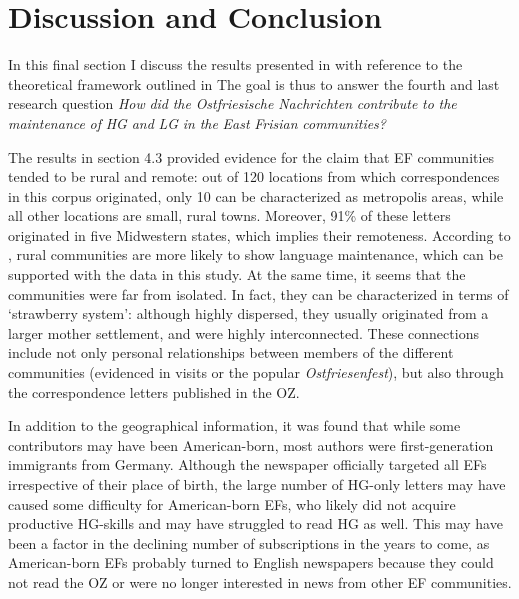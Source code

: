 \documentclass[output=paper]{langsci/langscibook}
\begin{document}
\section{Discussion and Conclusion} %
\label{sec:rocker:5}
 
In this final section I discuss the results presented in  with reference to the theoretical framework outlined in  The goal is thus to answer the fourth and last research question \textit{How} \textit{did} \textit{the} \textit{Ostfriesische} \textit{Nachrichten} \textit{contribute} \textit{to} \textit{the} \textit{maintenance} \textit{of} \textit{HG} \textit{and} \textit{LG} \textit{in} \textit{the} \textit{East} \textit{Frisian} \textit{communities?}
 

 
The results in section 4.3 provided evidence for the claim that EF communities tended to be rural and remote: out of 120 locations from which correspondences in this corpus originated, only 10 can be characterized as metropolis areas, while all other locations are small, rural towns. Moreover, 91\% of these letters originated in five Midwestern states, which implies their remoteness. According to \citet{Louden2006}, rural communities are more likely to show language maintenance, which can be supported with the data in this study. At the same time, it seems that the communities were far from isolated. In fact, they can be characterized in terms of  ‘strawberry system’: although highly dispersed, they usually originated from a larger mother settlement, and were highly interconnected. These connections include not only personal relationships between members of the different communities (evidenced in visits or the popular \textit{Ostfriesenfest}), but also through the correspondence letters published in the OZ. 
 

 
In addition to the geographical information, it was found that while some contributors may have been American-born, most authors were first-generation immigrants from Germany. Although the newspaper officially targeted all EFs irrespective of their place of birth, the large number of HG-only letters may have caused some difficulty for American-born EFs, who likely did not acquire productive HG-skills and may have struggled to read HG as well. This may have been a factor in the declining number of subscriptions in the years to come, as American-born EFs probably turned to English newspapers because they could not read the OZ or were no longer interested in news from other EF communities.
 
\end{document}
